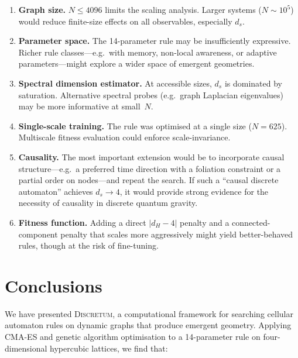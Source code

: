 \documentclass[aps,prd,twocolumn,superscriptaddress,floatfix]{revtex4-2}
\begin{document}
\begin{enumerate}
\item \textbf{Graph size.}  $N \le 4096$ limits the scaling
  analysis.  Larger systems ($N \sim 10^5$) would reduce
  finite-size effects on all observables, especially $d_s$.

\item \textbf{Parameter space.}  The 14-parameter rule may be
  insufficiently expressive.  Richer rule classes---e.g.\
  with memory, non-local awareness, or adaptive
  parameters---might explore a wider space of emergent
  geometries.

\item \textbf{Spectral dimension estimator.}  At accessible
  sizes, $d_s$ is dominated by saturation.  Alternative
  spectral probes (e.g.\ graph Laplacian eigenvalues) may be
  more informative at small~$N$.

\item \textbf{Single-scale training.}  The rule was optimised
  at a single size ($N = 625$).  Multiscale fitness
  evaluation could enforce scale-invariance.

\item \textbf{Causality.}  The most important extension would
  be to incorporate causal structure---e.g.\ a preferred
  time direction with a foliation constraint or a partial
  order on nodes---and repeat the search.  If such a
  ``causal discrete automaton'' achieves $d_s \to 4$, it
  would provide strong evidence for the necessity of
  causality in discrete quantum gravity.

\item \textbf{Fitness function.}  Adding a direct $|d_H - 4|$
  penalty and a connected-component penalty that scales
  more aggressively might yield better-behaved rules,
  though at the risk of fine-tuning.
\end{enumerate}


\section{Conclusions}
\label{sec:conclusions}

We have presented \textsc{Discretum}, a computational framework
for searching cellular automaton rules on dynamic graphs that
produce emergent geometry.  Applying CMA-ES and genetic algorithm
optimisation to a 14-parameter rule on four-dimensional hypercubic
lattices, we find that:
\end{document}
